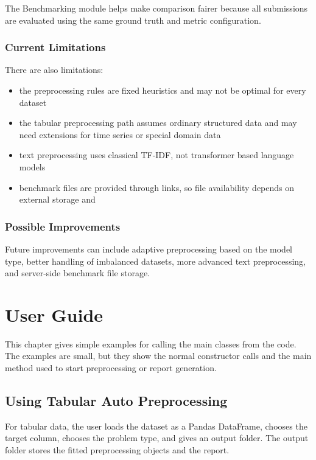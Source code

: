 \documentclass[12pt,a4paper,oneside]{report}
\renewcommand{\lstlistingname}{Algorithm}
\begin{document}
\noindent The Benchmarking module helps make comparison fairer because all submissions
are evaluated using the same ground truth and metric configuration.

\subsection{Current Limitations}

There are also limitations:

\begin{itemize}[leftmargin=*]
  \item the preprocessing rules are fixed heuristics and may not be optimal for
        every dataset
  \item the tabular preprocessing path assumes ordinary structured data and may
        need extensions for time series or special domain data
  \item text preprocessing uses classical TF-IDF, not transformer based
        language models
  \item benchmark files are provided through links, so file availability
        depends on external storage and
\end{itemize}

\subsection{Possible Improvements}

Future improvements can include adaptive preprocessing based on the model type,
better handling of imbalanced datasets, more advanced text preprocessing,
and server-side benchmark file storage. 

\appendix
\renewcommand{\lstlistingname}{Code Example}
\chapter{User Guide}
\label{chap:user-guide}

This chapter gives simple examples for calling the main classes from the code.
The examples are small, but they show the normal constructor calls and the main
method used to start preprocessing or report generation.

\section{Using Tabular Auto Preprocessing}

For tabular data, the user loads the dataset as a Pandas DataFrame, chooses the
target column, chooses the problem type, and gives an output folder. The output
folder stores the fitted preprocessing objects and the report.
\end{document}
